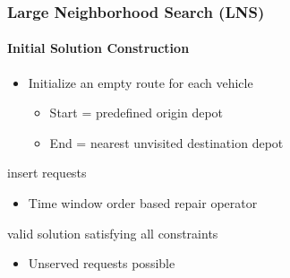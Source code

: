 \documentclass[aspectratio=1610]{beamer}
\let\oldfootnotesize\footnotesize
\renewcommand*{\footnotesize}{\oldfootnotesize\fontsize{6}{4}\selectfont}
\renewcommand{\footnotesize}{\scriptsize}
\begin{document}
\begin{frame}[noframenumbering]
  \frametitle{Large Neighborhood Search (LNS)}
  \framesubtitle{Initial Solution Construction}
  
\begin{itemize}
	\item Initialize an empty route for each vehicle %
		\begin{itemize}
			\item Start = predefined origin depot 
			\item End = nearest unvisited destination depot
		\end{itemize}
\end{itemize}

\bigskip

 insert requests 
\begin{itemize}
	\item Time window order based repair operator
\end{itemize}

\bigskip

 valid solution satisfying all constraints 
\begin{itemize}
	\item Unserved requests possible
\end{itemize}

\end{frame}
\end{document}
